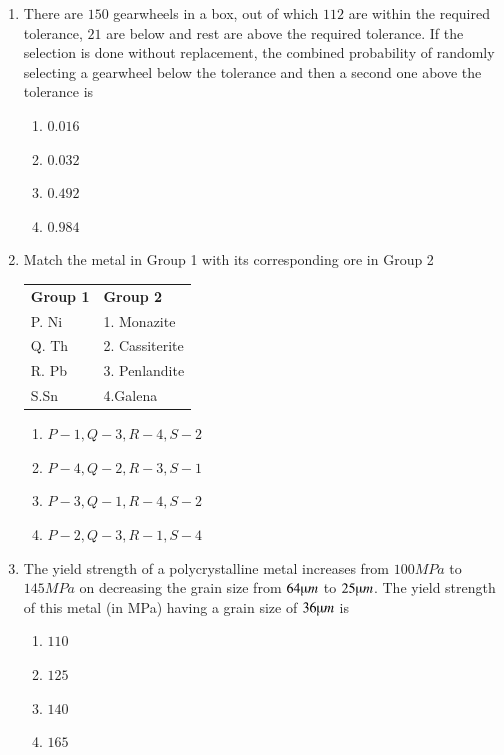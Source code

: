 \documentclass[journal]{IEEEtran}
\theoremstyle{remark}
\begin{document}
\begin{enumerate}
\item There are $150$ gearwheels in a box, out of which $112$ are within the required tolerance, $21$ are below and rest are above the required tolerance. If the selection is done without replacement, the combined probability of randomly selecting a gearwheel below the tolerance and then a second one above the tolerance is   \hfill{}
\begin{multicols}{4}
\begin{enumerate}
\item $0.016 $
\item  $0.032$ 
\item $0.492$
\item $0.984$ 
\end{enumerate}
\end{multicols}
\item Match the metal in Group 1 with its corresponding ore in Group 2\hfill{}
\begin{center}
\begin{tabular}{ll}
\textbf{Group 1 }    &  \textbf{Group 2}\\
P.  Ni      &1. Monazite\\
Q. Th  &2. Cassiterite\\ 
R. Pb  &3. Penlandite \\
S.Sn  & 4.Galena 
\end{tabular}
\end{center}
\begin{multicols}{2}
\begin{enumerate}
\item  $P-1, Q-3, R-4, S-2$
\item $P-4, Q-2, R-3, S-1$ 
\item  $P-3, Q-1, R-4, S-2$ 
\item $P-2, Q-3, R-1, S-4$
\end{enumerate}
\end{multicols}

\item The yield strength of a polycrystalline metal increases from $100 MPa$ to $145 MPa$ on decreasing the grain size from $64 \micro m$ to $25 \micro m$. The yield strength of this metal (in MPa) having a grain size of $36\micro m$ is
\hfill{}
\begin{multicols}{4}
\begin{enumerate}
\item $110$ 
\item  $125$
\item $140$
\item $165$ 
\end{enumerate}
\end{multicols}


\end{enumerate}
\end{document}
